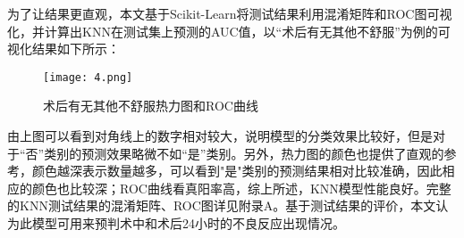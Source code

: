 为了让结果更直观，本文基于Scikit-Learn将测试结果利用混淆矩阵和ROC图可视化，并计算出KNN在测试集上预测的AUC值，以“术后有无其他不舒服”为例的可视化结果如下所示：

\begin{figure}[H] %
	\centering %
	\texttt{[image: 4.png]} 
	\caption{术后有无其他不舒服热力图和ROC曲线} 
	\label{Fig.main4} 
\end{figure}

由上图可以看到对角线上的数字相对较大，说明模型的分类效果比较好，但是对于“否”类别的预测效果略微不如“是”类别。另外，热力图的颜色也提供了直观的参考，颜色越深表示数量越多，可以看到"是"类别的预测结果相对比较准确，因此相应的颜色也比较深；ROC曲线看真阳率高，综上所述，KNN模型性能良好。完整的KNN测试结果的混淆矩阵、ROC图详见附录A。基于测试结果的评价，本文认为此模型可用来预判术中和术后24小时的不良反应出现情况。





















































































